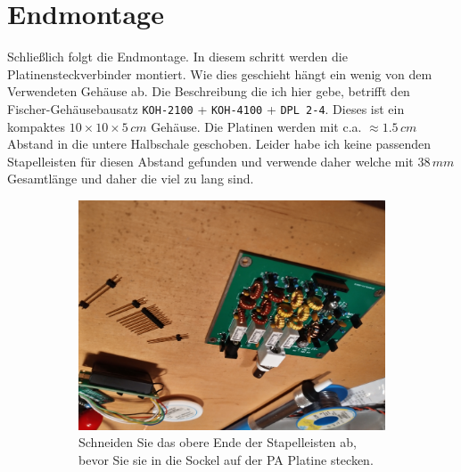 \documentclass[10pt, a4paper,twoside]{scrartcl}
\begin{document}
\cleardoublepage
\section{Endmontage} \label{sec:box}
Schließlich folgt die Endmontage. In diesem schritt werden die Platinensteckverbinder montiert. Wie dies geschieht hängt ein wenig von dem Verwendeten Gehäuse ab. Die Beschreibung die ich hier gebe, betrifft den Fischer-Gehäusebausatz \texttt{KOH-2100} + \texttt{KOH-4100} + \texttt{DPL 2-4}. Dieses ist ein kompaktes $10 \times 10 \times 5\,cm$ Gehäuse. Die Platinen werden mit c.a. $\approx 1.5\,cm$ Abstand in die untere Halbschale geschoben. Leider habe ich keine passenden Stapelleisten für diesen Abstand gefunden und verwende daher welche mit $38\,mm$ Gesamtlänge und daher die viel zu lang sind.

\begin{figure}[!ht]
 \centering
 \begin{subfigure}{0.49\linewidth}
  \includegraphics[width=\linewidth]{fig/stackers_small.png}
  \caption{Schneiden Sie das obere Ende der Stapelleisten ab, bevor Sie sie in die Sockel auf der PA Platine stecken.}  \label{fig:stackers}
 \end{subfigure}
 \begin{subfigure}{0.49\linewidth}

\end{subfigure}
\end{figure}
\end{document}
